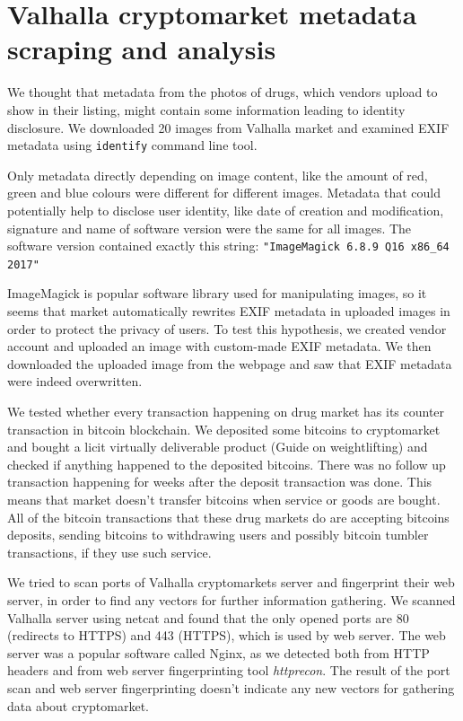 \documentclass[
  digital, %
  table,   %
  lof,     %
  lot,     %
  oneside
]{fithesis3}
\begin{document}
\section{Valhalla cryptomarket metadata scraping and analysis}

We thought that metadata from the photos of drugs, which vendors upload
to show in their listing, might contain some information leading to identity disclosure.
We downloaded 20 images from Valhalla market and examined 
EXIF metadata using \texttt{identify} command line tool.

Only metadata directly depending on image content, like the amount of red, green and blue colours
were different for different images.
Metadata that could potentially help to disclose user identity,
like date of creation and modification, signature and name of software version were the same for all images.
The software version contained exactly this string:
\texttt{"ImageMagick 6.8.9 Q16 x86\_64 2017"}

ImageMagick is popular software library used for manipulating images, so it seems
that market automatically rewrites EXIF metadata in uploaded images in order to protect the privacy of users.
To test this hypothesis, we created vendor account and uploaded an image with
custom-made EXIF metadata. We then downloaded the uploaded image from the webpage and saw that EXIF metadata were indeed overwritten.

We tested whether every transaction happening on drug market has its counter transaction
in bitcoin blockchain.
We deposited some bitcoins to cryptomarket and bought a licit virtually deliverable
product (Guide on weightlifting) and checked if anything happened to the deposited bitcoins.
There was no follow up transaction happening for weeks after the deposit transaction was done.
This means that market doesn't transfer bitcoins when service or goods are bought.
All of the bitcoin transactions that these drug markets do 
are accepting bitcoins deposits,
sending bitcoins to withdrawing users and possibly bitcoin tumbler transactions, if they
use such service.

We tried to scan ports of Valhalla cryptomarkets server and fingerprint their web server,
in order to find any vectors for further information gathering. 
We scanned Valhalla server using netcat and found that the only opened ports are 80 (redirects to HTTPS) and 443 (HTTPS),
which is used by web server. The web server was a popular software called Nginx, as we detected
both from HTTP headers and from web server fingerprinting tool \emph{httprecon}.
The result of the port scan and web server fingerprinting doesn't indicate
any new vectors for gathering data about cryptomarket.
\end{document}
